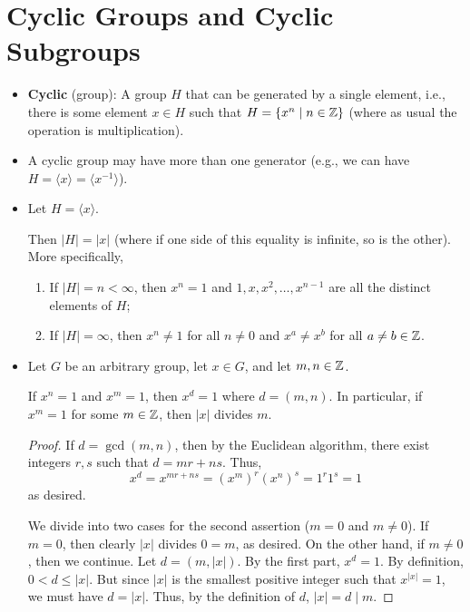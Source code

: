 \documentclass[../notes.tex]{subfiles}
\begin{document}
\section{Cyclic Groups and Cyclic Subgroups}
\begin{itemize}
    \item \textbf{Cyclic} (group): A group $H$ that can be generated by a single element, i.e., there is some element $x\in H$ such that $H=\{x^n\mid n\in\mathbb{Z}\}$ (where as usual the operation is multiplication).
    \item A cyclic group may have more than one generator (e.g., we can have $H=\langle x\rangle=\langle x^{-1}\rangle$).
    \item Let $H=\langle x\rangle$.
    \begin{proposition}
        Then $|H|=|x|$ (where if one side of this equality is infinite, so is the other). More specifically,
        \begin{enumerate}[label={\textbf{\textup{(\arabic*)}}}]
            \item If $|H|=n<\infty$, then $x^n=1$ and $1,x,x^2,\dots,x^{n-1}$ are all the distinct elements of $H$;
            \item If $|H|=\infty$, then $x^n\neq 1$ for all $n\neq 0$ and $x^a\neq x^b$ for all $a\neq b\in\mathbb{Z}$.
        \end{enumerate}
    \end{proposition}
    \item Let $G$ be an arbitrary group, let $x\in G$, and let $m,n\in\mathbb{Z}$.
    \begin{proposition}
        If $x^n=1$ and $x^m=1$, then $x^d=1$ where $d=(m,n)$. In particular, if $x^m=1$ for some $m\in\mathbb{Z}$, then $|x|$ divides $m$.
        \begin{proof}
            If $d=\gcd(m,n)$, then by the Euclidean algorithm, there exist integers $r,s$ such that $d=mr+ns$. Thus,
            \begin{equation*}
                x^d = x^{mr+ns}
                = (x^m)^r(x^n)^s
                = 1^r1^s
                = 1
            \end{equation*}
            as desired.\par
            We divide into two cases for the second assertion ($m=0$ and $m\neq 0$). If $m=0$, then clearly $|x|$ divides $0=m$, as desired. On the other hand, if $m\neq 0$, then we continue. Let $d=(m,|x|)$. By the first part, $x^d=1$. By definition, $0<d\leq |x|$. But since $|x|$ is the smallest positive integer such that $x^{|x|}=1$, we must have $d=|x|$. Thus, by the definition of $d$, $|x|=d\mid m$.

\end{proof}
\end{proposition}
\end{itemize}
\end{document}
